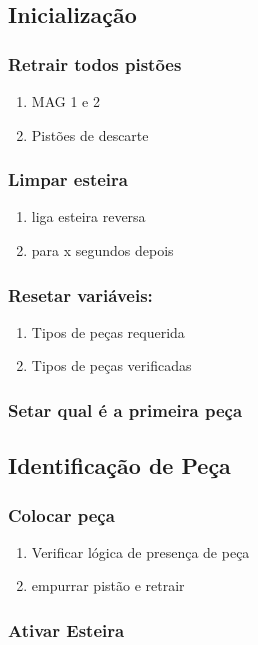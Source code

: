 \documentclass[11pt]{article}
\begin{document}
\subsection{Inicialização}
\label{sec-1-1}
\subsubsection{Retrair todos pistões}
\label{sec-1-1-1}
\begin{enumerate}
\item MAG 1 e 2
\item Pistões de descarte
\end{enumerate}
\subsubsection{Limpar esteira}
\label{sec-1-1-2}
\begin{enumerate}
\item liga esteira reversa
\item para x segundos depois
\end{enumerate}
\subsubsection{Resetar variáveis:}
\label{sec-1-1-3}
\begin{enumerate}
\item Tipos de peças requerida
\item Tipos de peças verificadas
\end{enumerate}
\subsubsection{Setar qual é a primeira peça}
\label{sec-1-1-4}
\subsection{Identificação de Peça}
\label{sec-1-2}
\subsubsection{Colocar peça}
\label{sec-1-2-1}
\begin{enumerate}
\item Verificar lógica de presença de peça
\item empurrar pistão e retrair
\end{enumerate}
\subsubsection{Ativar Esteira}
\label{sec-1-2-2}
\end{document}
